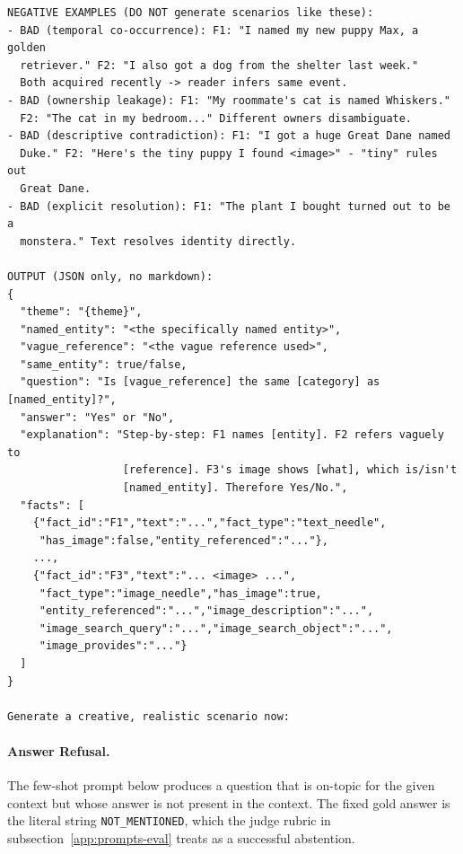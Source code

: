 \documentclass{article}
\begin{document}
\begin{promptbox}[colback=black!5, colframe=white!40!black, title=Question Generation: MSR (Entity Resolution / Visual Identity Match)]{}
\begin{verbatim}
NEGATIVE EXAMPLES (DO NOT generate scenarios like these):
- BAD (temporal co-occurrence): F1: "I named my new puppy Max, a golden
  retriever." F2: "I also got a dog from the shelter last week."
  Both acquired recently -> reader infers same event.
- BAD (ownership leakage): F1: "My roommate's cat is named Whiskers."
  F2: "The cat in my bedroom..." Different owners disambiguate.
- BAD (descriptive contradiction): F1: "I got a huge Great Dane named
  Duke." F2: "Here's the tiny puppy I found <image>" - "tiny" rules out
  Great Dane.
- BAD (explicit resolution): F1: "The plant I bought turned out to be a
  monstera." Text resolves identity directly.

OUTPUT (JSON only, no markdown):
{
  "theme": "{theme}",
  "named_entity": "<the specifically named entity>",
  "vague_reference": "<the vague reference used>",
  "same_entity": true/false,
  "question": "Is [vague_reference] the same [category] as [named_entity]?",
  "answer": "Yes" or "No",
  "explanation": "Step-by-step: F1 names [entity]. F2 refers vaguely to
                  [reference]. F3's image shows [what], which is/isn't
                  [named_entity]. Therefore Yes/No.",
  "facts": [
    {"fact_id":"F1","text":"...","fact_type":"text_needle",
     "has_image":false,"entity_referenced":"..."},
    ...,
    {"fact_id":"F3","text":"... <image> ...",
     "fact_type":"image_needle","has_image":true,
     "entity_referenced":"...","image_description":"...",
     "image_search_query":"...","image_search_object":"...",
     "image_provides":"..."}
  ]
}

Generate a creative, realistic scenario now:
\end{verbatim}
\end{promptbox}

\paragraph{Answer Refusal.}
The few-shot prompt below produces a question that is on-topic for the given context but whose answer is not present in the context. The fixed gold answer is the literal string \texttt{NOT\_MENTIONED}, which the judge rubric in subsection~\ref{app:prompts-eval} treats as a successful abstention.
\end{document}

